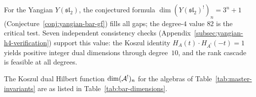 For the Yangian $Y(\mathfrak{sl}_2)$, the conjectured formula
$\dim (Y(\mathfrak{sl}_2)^!)_n = 3^n + 1$ (Conjecture~\ref{conj:yangian-bar-gf})
fills all gaps; the degree-$4$ value $82$ is the critical test.
Seven independent consistency checks
(Appendix~\ref{subsec:yangian-h4-verification}) support this value:
the Koszul identity $H_A(t) \cdot H_{A^!}(-t) = 1$ yields positive
integer dual dimensions through degree~$10$, and the rank cascade is
feasible at all degrees.

\begin{proposition}
\label{prop:bar-dimensions}
The Koszul dual Hilbert function $\dim (\mathcal{A}^!)_n$ for the algebras of
Table~\textup{\ref{tab:master-invariants}} are as listed in
Table~\textup{\ref{tab:bar-dimensions}}.
\end{proposition}

